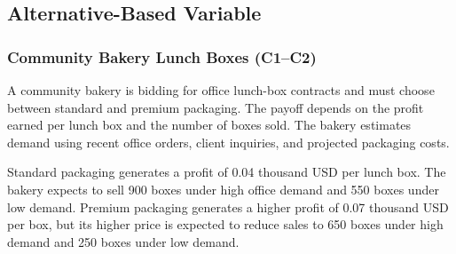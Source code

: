 
\subsection{Alternative-Based Variable}
	\label{sec:alternative-based-variable-payoff-profit-per-item-times-number-of-items}



	\subsubsection{Community Bakery Lunch Boxes (C1--C2)}
	\label{sec:problem6-community-bakery-lunch-boxes-c1-c2}
	
	A community bakery is bidding for office lunch-box contracts and must choose between standard and premium packaging. The payoff depends on the profit earned per lunch box and the number of boxes sold. The bakery estimates demand using recent office orders, client inquiries, and projected packaging costs.
	
	Standard packaging generates a profit of 0.04 thousand USD per lunch box. The bakery expects to sell 900 boxes under high office demand and 550 boxes under low demand. Premium packaging generates a higher profit of 0.07 thousand USD per box, but its higher price is expected to reduce sales to 650 boxes under high demand and 250 boxes under low demand.
	
